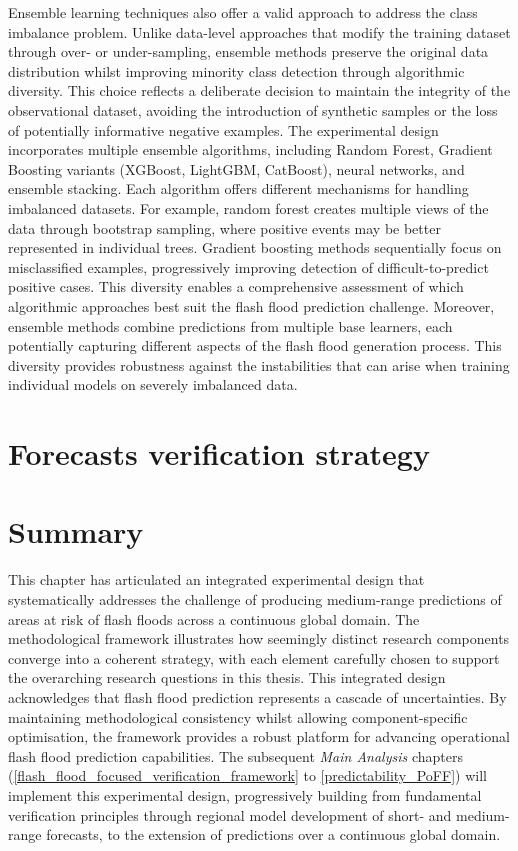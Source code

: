 Ensemble  learning techniques also offer a valid approach to address the class imbalance problem. Unlike data-level approaches that modify the training dataset through over- or under-sampling, ensemble methods preserve the original data distribution whilst improving minority class detection through algorithmic diversity. This choice reflects a deliberate decision to maintain the integrity of the observational dataset, avoiding the introduction of synthetic samples or the loss of potentially informative negative examples. The experimental design incorporates multiple ensemble algorithms, including Random Forest, Gradient Boosting variants (XGBoost, LightGBM, CatBoost), neural networks, and ensemble stacking. Each algorithm offers different mechanisms for handling imbalanced datasets. For example, random forest creates multiple views of the data through bootstrap sampling, where positive events may be better represented in individual trees. Gradient boosting methods sequentially focus on misclassified examples, progressively improving detection of difficult-to-predict positive cases. This diversity enables a comprehensive assessment of which algorithmic approaches best suit the flash flood prediction challenge. Moreover, ensemble methods combine predictions from multiple base learners, each potentially capturing different aspects of the flash flood generation process. This diversity provides robustness against the instabilities that can arise when training individual models on severely imbalanced data.


\section{Forecasts verification strategy}
\label{forecasts_verification_strategy}




\section{Summary}

This chapter has articulated an integrated experimental design that systematically addresses the challenge of producing medium-range predictions of areas at risk of flash floods across a continuous global domain. The methodological framework illustrates how seemingly distinct research components converge into a coherent strategy, with each element carefully chosen to support the overarching research questions in this thesis. This integrated design acknowledges that flash flood prediction represents a cascade of uncertainties. By maintaining methodological consistency whilst allowing component-specific optimisation, the framework provides a robust platform for advancing operational flash flood prediction capabilities. The subsequent \textit{Main Analysis} chapters (\ref{flash_flood_focused_verification_framework} to \ref{predictability_PoFF}) will implement this experimental design, progressively building from fundamental verification principles through regional model development of short- and medium-range forecasts, to the extension of predictions over a continuous global domain.